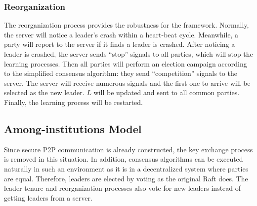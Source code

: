 \subsubsection{\textbf{Reorganization}}
The reorganization process provides the robustness for the framework. Normally, the server will notice a leader's crash within a heart-beat cycle. Meanwhile, a party will report to the server if it finds a leader is crashed. After noticing a leader is crashed, the server sends ``stop'' signals to all parties, which will stop the learning processes. Then all parties will perform an election campaign according to the simplified consensus algorithm: they send ``competition'' signals to the server. The server will receive numerous signals and the first one to arrive will be selected as the new leader. $L$ will be updated and sent to all common parties. Finally, the learning process will be restarted.

\subsection{Among-institutions Model}
Since secure P2P communication is already constructed, the key exchange process is removed in this situation. In addition, consensus algorithms can be executed naturally in such an environment as it is in a decentralized system where parties are equal. Therefore, leaders are elected by voting as the original Raft does. The leader-tenure and reorganization processes also vote for new leaders instead of getting leaders from a server.